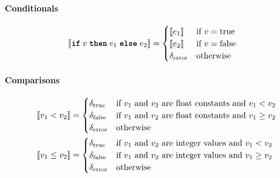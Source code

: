 \paragraph{Conditionals}
\begin{align*}
\llbracket  \textnormal{\ttfamily\bfseries if} \; v \; \textnormal{\ttfamily\bfseries then} \; e_1 \; \textnormal{\ttfamily\bfseries else} \; e_2  \rrbracket & = 
\begin{cases}
	\llbracket e_1 \rrbracket  & \text{if $v = \textnormal{true}$} \\
	\llbracket e_2 \rrbracket  & \text{if $v = \textnormal{false}$} \\
	\delta_{\textnormal{error}} & \text{otherwise}
\end{cases}
\end{align*}
%

\paragraph{Comparisons}
\begin{align*}
\llbracket  v_1 < v_2  \rrbracket &= \begin{cases}
    \delta_{\text{true}} & \text{if $v_1$ and $v_2$ are float constants and~} v_1 < v_2 \\
    \delta_{\text{false}} & \text{if $v_1$ and $v_2$ are float constants and~} v_1 \geq v_2\\
    \delta_{\textnormal{error}} & \text{otherwise}
\end{cases} \\
\llbracket  v_1 \leq v_2  \rrbracket &=\begin{cases}
	\delta_{\text{true}} & \text{if $v_1$ and $v_2$ are integer values and~} v_1 < v_2 \\
	\delta_{\text{false}} & \text{if $v_1$ and $v_2$ are integer values and~} v_1 \geq v_2\\
	\delta_{\textnormal{error}} & \text{otherwise}
\end{cases}
\end{align*}
%

